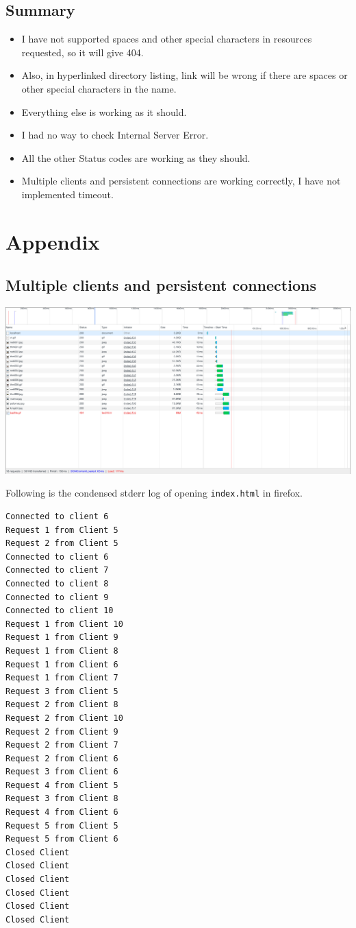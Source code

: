 \documentclass[11pt]{article}
\begin{document}
\subsection{Summary}
\label{sec:orgheadline23}
\begin{itemize}
\item I have not supported spaces and other special characters in resources requested, so it will give 404.
\item Also, in hyperlinked directory listing, link will be wrong if there are spaces or other special characters in the name.
\item Everything else is working as it should.
\item I had no way to check Internal Server Error.
\item All the other Status codes are working as they should.
\item Multiple clients and persistent connections are working correctly, I have not implemented timeout.
\end{itemize}
\newpage
\section{Appendix}
\label{sec:orgheadline26}

\subsection{Multiple clients and persistent connections}
\label{sec:orgheadline9}
\label{orgtarget1}
\includegraphics[width=18cm]{./multipleclients.png}


\label{orgtarget2}
\noindent Following is the condensed stderr log of opening \texttt{index.html} in firefox.

\begin{verbatim}
Connected to client 6
Request 1 from Client 5
Request 2 from Client 5
Connected to client 6
Connected to client 7
Connected to client 8
Connected to client 9
Connected to client 10
Request 1 from Client 10
Request 1 from Client 9
Request 1 from Client 8
Request 1 from Client 6
Request 1 from Client 7
Request 3 from Client 5
Request 2 from Client 8
Request 2 from Client 10
Request 2 from Client 9
Request 2 from Client 7
Request 2 from Client 6
Request 3 from Client 6
Request 4 from Client 5
Request 3 from Client 8
Request 4 from Client 6
Request 5 from Client 5
Request 5 from Client 6
Closed Client
Closed Client
Closed Client
Closed Client
Closed Client
Closed Client
\end{verbatim}
\end{document}

